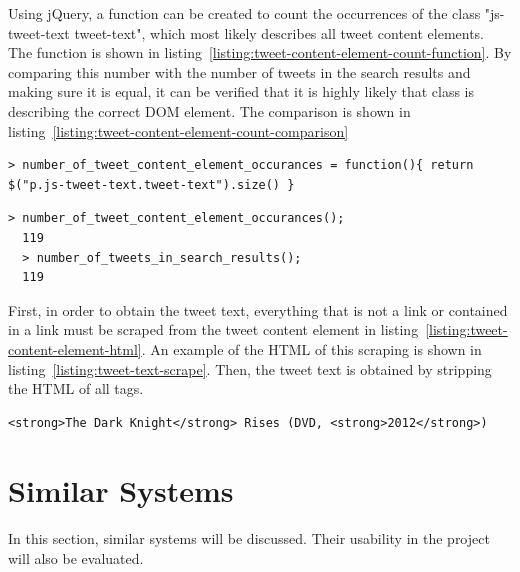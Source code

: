 \noindent
Using jQuery, a function can be created to count the occurrences of the class "js-tweet-text tweet-text", which most likely describes all tweet content elements. The function is shown in listing~\ref{listing:tweet-content-element-count-function}. By comparing this number with the number of tweets in the search results and making sure it is equal, it can be verified that it is highly likely that class is describing the correct DOM element. The comparison is shown in
listing~\ref{listing:tweet-content-element-count-comparison}

\begin{lstlisting}[caption={Creating a function in GCDT JS Console for counting the occurance of tweet content elements on the Twitter search result page},label={listing:tweet-content-element-count-function},captionpos=b]
  > number_of_tweet_content_element_occurances = function(){ return $("p.js-tweet-text.tweet-text").size() }
\end{lstlisting}

\begin{lstlisting}[caption={Running functions in GCDT JS Console to show that the number of tweet content elements matches the number of tweets},label={listing:tweet-content-element-count-comparison},captionpos=b]
  > number_of_tweet_content_element_occurances();
  119
  > number_of_tweets_in_search_results();
  119
\end{lstlisting}

\noindent
First, in order to obtain the tweet text, everything that is not a link or contained in a link must be scraped from the tweet content element in listing~\ref{listing:tweet-content-element-html}. An example of the HTML of this scraping is shown in listing~\ref{listing:tweet-text-scrape}. Then, the tweet text is obtained by stripping the HTML of all tags.

\begin{lstlisting}[caption={The HTML of scraping everything from listing-\ref{listing:tweet-content-element-html} that is not a link},label={listing:tweet-text-scrape},captionpos=b]
  <strong>The Dark Knight</strong> Rises (DVD, <strong>2012</strong>)
\end{lstlisting}



\section{Similar Systems}\label{sec:similarsys}
In this section, similar systems will be discussed. Their usability in the project will also be evaluated.


